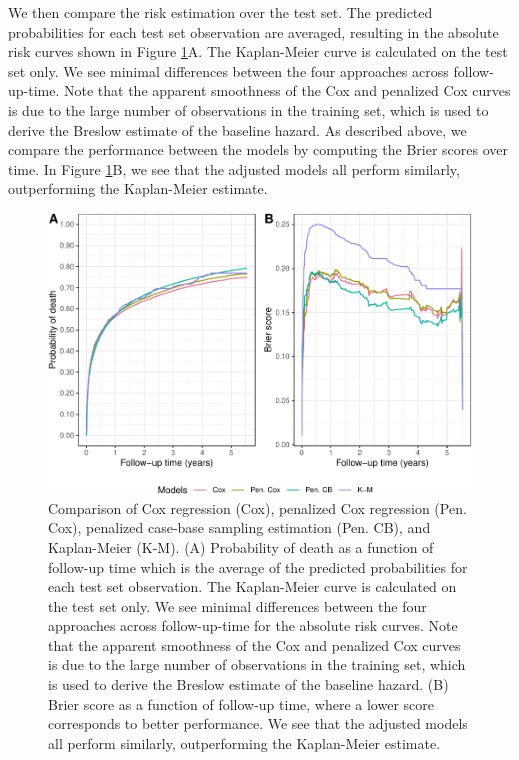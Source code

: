 We then compare the risk estimation over the test set. The predicted probabilities for each test set observation are averaged, resulting in the absolute risk curves shown in Figure \ref{fig:cs3FinalBrier}A. The Kaplan-Meier curve is calculated on the test set only. We see minimal differences between the four approaches across follow-up-time. Note that the apparent smoothness of the Cox and penalized Cox curves is due to the large number of observations in the training set, which is used to derive the Breslow estimate of the baseline hazard. As described above, we compare the performance between the models by computing the Brier scores over time. In Figure \ref{fig:cs3FinalBrier}B, we see that the adjusted models all perform similarly, outperforming the Kaplan-Meier estimate.

\begin{figure}[ht]
\includegraphics[width=\textwidth,keepaspectratio=true]{./cs3FinalBrier-1} \caption{Comparison of Cox regression (Cox), penalized Cox regression (Pen. Cox), penalized case-base sampling estimation (Pen. CB), and Kaplan-Meier (K-M). (A) Probability of death as a function of follow-up time which is the average of the predicted probabilities for each test set observation. The Kaplan-Meier curve is calculated on the test set only. We see minimal differences between the four approaches across follow-up-time for the absolute risk curves. Note that the apparent smoothness of the Cox and penalized Cox curves is due to the large number of observations in the training set, which is used to derive the Breslow estimate of the baseline hazard. (B) Brier score as a function of follow-up time, where a lower score corresponds to better performance. We see that the adjusted models all perform similarly, outperforming the Kaplan-Meier estimate.}\label{fig:cs3FinalBrier}
\end{figure}

